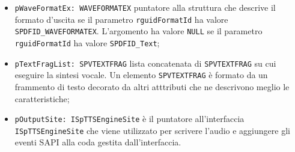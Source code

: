 \begin{itemize}
\begin{itemize}
		\item \texttt{pWaveFormatEx: WAVEFORMATEX} puntatore alla struttura che descrive il formato d'uscita se il parametro \texttt{rguidFormatId} ha valore \texttt{SPDFID\_WAVEFORMATEX}. L'argomento ha valore \texttt{NULL} se il parametro \texttt{rguidFormatId} ha valore \texttt{SPDFID\_Text};
		\item \texttt{pTextFragList: SPVTEXTFRAG} lista concatenata di \texttt{SPVTEXTFRAG} su cui eseguire la sintesi vocale. Un elemento \texttt{SPVTEXTFRAG} è formato da un frammento di testo decorato da altri atttributi che ne descrivono meglio le caratteristiche;
		\item \texttt{pOutputSite: ISpTTSEngineSite} è il puntatore all'interfaccia \texttt{ISpTTSEngineSite} che viene utilizzato per scrivere l'audio e aggiungere gli eventi SAPI alla coda gestita dall'interfaccia.
	\end{itemize}  
\end{itemize}

